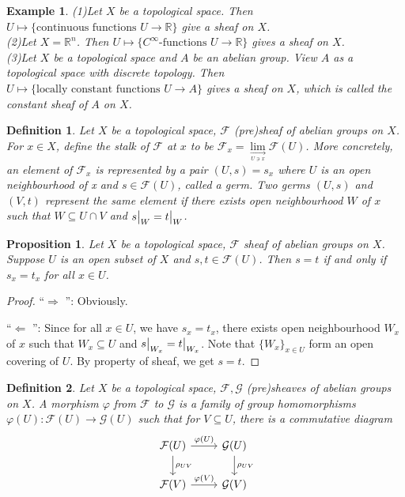 \documentclass{ctexart}
\newtheorem{definition}{Definition}[section]
\newtheorem{proposition}{Proposition}[section]
\newtheorem{example}{Example}[section]
\newcommand{\leftquotes}{\textquotedblleft}
\newcommand{\rightquotes}{\textquotedblright}
\begin{document}
\begin{example}
    (1)Let $X$ be a topological space.
    Then $U \longmapsto \{\text{continuous functions $U \longrightarrow \mathbb{R}$}\}$ give a sheaf on $X$. \\
    (2)Let $X = \mathbb{R}^{n}$.
    Then $U \longmapsto \{\text{$C^{\infty}$-functions $U \longrightarrow \mathbb{R}$}\}$ gives a sheaf on $X$. \\
    (3)Let $X$ be a topological space and $A$ be an abelian group.
    View $A$ as a topological space with discrete topology.
    Then $U \longmapsto \{\text{locally constant functions $U \longrightarrow A$}\}$ gives a sheaf on $X$, which is called the constant sheaf of $A$ on $X$.
\end{example}
\begin{definition}
    Let $X$ be a topological space, $\mathcal{F}$ (pre)sheaf of abelian groups on $X$.
    For $x\in X$, define the stalk of $\mathcal{F}$ at $x$ to be $\mathcal{F}_{x} = \underset{\underset{U\ni x}{\longrightarrow}}{\lim} \mathcal{F}(U)$.
    More concretely, an element of $\mathcal{F}_{x}$ is represented by a pair $(U, s) = s_{x}$ where $U$ is an open neighbourhood of x and $s\in \mathcal{F}(U)$, called a germ.
    Two germs $(U, s)$ and $(V, t)$ represent the same element if there exists open neighbourhood $W$ of $x$ such that $W \subseteq U \cap V$ and $s\big{|}_{W} = t\big{|}_{W}$.
\end{definition}
\begin{proposition}
    Let $X$ be a topological space, $\mathcal{F}$ sheaf of abelian groups on $X$.
    Suppose $U$ is an open subset of $X$ and $s,t\in \mathcal{F}(U)$.
    Then $s = t$ if and only if $s_{x} = t_{x}$ for all $x\in U$.
    \label{Proposition 1.5}
\end{proposition}
\begin{proof}
    \leftquotes $\Rightarrow$ \rightquotes : Obviously.
    \par
    \leftquotes $\Leftarrow$ \rightquotes : Since for all $x\in U$, we have $s_{x} = t_{x}$,
    there exists open neighbourhood $W_{x}$ of $x$ such that $W_{x} \subseteq U$ and $s\big{|}_{W_{x}} = t\big{|}_{W_{x}}$.
    Note that $\{W_{x}\}_{x\in U}$ form an open covering of $U$.
    By property of sheaf, we get $s = t$.
\end{proof}
\begin{definition}
    Let $X$ be a topological space, $\mathcal{F}, \mathcal{G}$ (pre)sheaves of abelian groups on $X$.
    A morphism $\varphi$ from $\mathcal{F}$ to $\mathcal{G}$ is a family of group homomorphisms $\varphi(U): \mathcal{F}(U) \longrightarrow \mathcal{G}(U)$ such that for $V \subseteq U$,
    there is a commutative diagram
    \begin{equation*}
        \begin{tikzcd}
            \mathcal{F}(U) \arrow[r, "\varphi(U)"] \arrow[d, "\rho_{UV}"] &
            \mathcal{G}(U) \arrow[d, "\rho_{UV}"] \\
            \mathcal{F}(V) \arrow[r, "\varphi(V)"] &
            \mathcal{G}(V)
        \end{tikzcd}
    \end{equation*}
\end{definition}
\end{document}
